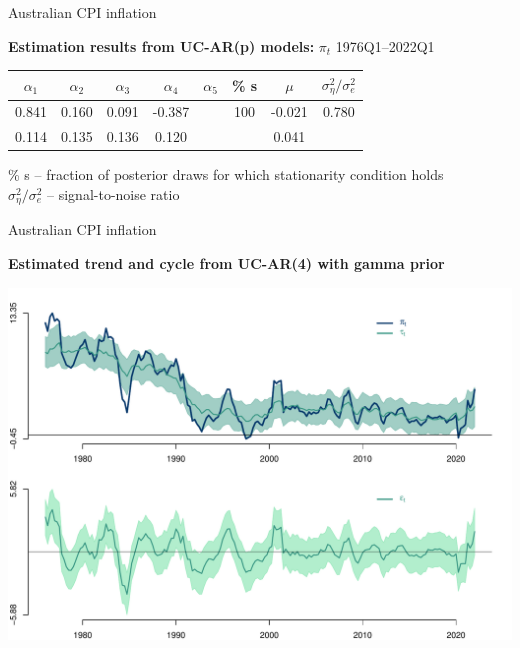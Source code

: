 \documentclass[notes,blackandwhite,mathsans,usenames,dvipsnames]{beamer}
\begin{document}
\begin{frame}{Australian CPI inflation}

\small
\begin{adjustwidth}{-0.5cm}{0cm}
\begin{center}
\textbf{Estimation results from UC-AR(p) models:} {\color{mcxs2}$\pi_t$ 1976Q1--2022Q1}

\footnotesize\smallskip\begin{tabular}{cccccccc}
\toprule
$\alpha_1$ & $\alpha_2$ & $\alpha_3$ & $\alpha_4$ & $\alpha_5$& \% s  & $\mu$ & $\sigma^2_\eta / \sigma^2_e$\\
\midrule
0.841 & 0.160 & 0.091 & -0.387 &  & 100 & -0.021 & 0.780 \\ 
 0.114 & 0.135 & 0.136 & 0.120 &  &  & 0.041 &  \\ [1ex]
\bottomrule
\end{tabular}

\smallskip 
\% s -- fraction of posterior draws for which stationarity condition holds\\
$\sigma^2_\eta / \sigma^2_e$ -- signal-to-noise ratio
\end{center}
\end{adjustwidth}
\end{frame}





\begin{frame}{Australian CPI inflation}

\small
\centering
\smallskip\textbf{Estimated trend and cycle from UC-AR(4) with gamma prior}

\includegraphics[scale=0.4, trim=2cm 0.5cm 2cm 0cm]{results/pi-gamma-uc-ar4.pdf}

\end{frame}
\end{document}
